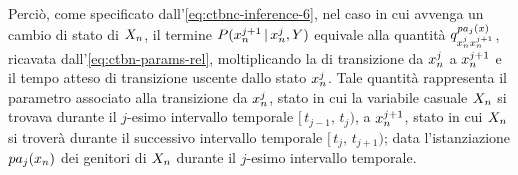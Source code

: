 Perciò, come specificato dall'\autoref{eq:ctbnc-inference-6}, nel caso in cui avvenga un cambio di stato di $\mathnormal{X}_n$, il termine $P(\mathnormal{x}_n^{j+1}\,\arrowvert\,\mathnormal{x}_n^j,\mathnormal{Y})$ equivale alla quantità $q_{\mathnormal{x}_n^j\mathnormal{x}_n^{j+1}}^{pa_j(\mathnormal{x})}$, ricavata dall'\autoref{eq:ctbn-params-rel}, moltiplicando la \emph{} di transizione da $\mathnormal{x}_n^j$ a $\mathnormal{x}_n^{j+1}$ e il tempo atteso di transizione uscente dallo stato $\mathnormal{x}_n^j$. Tale quantità rappresenta il parametro associato alla transizione da $\mathnormal{x}_n^j$, stato in cui la variabile casuale $\mathnormal{X}_n$ si trovava durante il $j$-esimo intervallo temporale $[\,t_{j-1},\,t_j)$, a $\mathnormal{x}_n^{j+1}$, stato in cui $\mathnormal{X}_n$ si troverà durante il successivo intervallo temporale $[\,t_j,\,t_{j+1})$; data l'istanziazione $pa_j(\mathnormal{x}_n)$ dei genitori di $\mathnormal{X}_n$ durante il $j$-esimo intervallo temporale.

